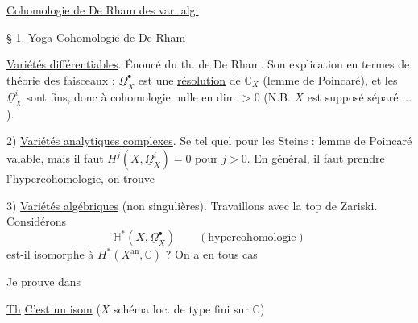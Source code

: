 \uline{Cohomologie de De Rham des var. alg.}


§ 1. \uline{Yoga Cohomologie de De Rham}

 \uline{Variétés différentiables}. Énoncé du th. de De Rham.
Son explication en termes de théorie des faisceaux :
 $\underline\Omega_X^\bullet$ est une \uline{résolution} de $\mathbb C_X$ (lemme de Poincaré), et les $\underline\Omega_X^i$ sont fins, donc à cohomologie nulle en dim $>0$ (N.B. $X$ est supposé séparé $\ldots$).

2) \uline{Variétés analytiques complexes}. Se  tel quel pour les Steins : lemme de Poincaré  valable, mais il faut $H^j(X,\underline\Omega_X^i)=0$ pour $j>0$. En général, il faut prendre l'hypercohomologie, on trouve
\margin{*)}

3) \uline{Variétés algébriques} (non singulières). Travaillons avec la top de Zariski. Considérons
\[
\mathbb H^*(X,\underline\Omega_X^\bullet)
\qquad(\text{hypercohomologie})
\]
est-il isomorphe à $H^*(X^{\mathrm{an}},\mathbb C)$ ? On a en tous cas

Je prouve dans 

\uline{Th} \uline{C'est un isom} ($X$ schéma loc. de type fini  sur $\mathbb C$)

